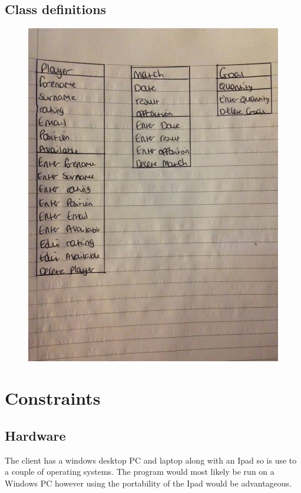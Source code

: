 \subsection{Class definitions}
\begin{figure}[H]
	\includegraphics[width=150mm]{classdef}
\end{figure}


\section{Constraints}

\subsection{Hardware}
The client has a windows desktop PC and laptop along with an Ipad so is use to a couple of operating systems. The program would most likely be run on a Windows PC however using the portability of the Ipad would be advantageous.
